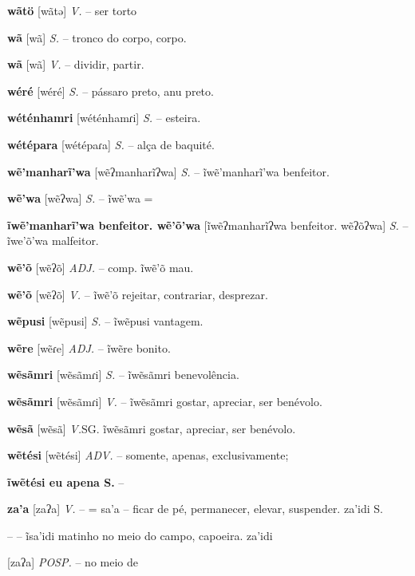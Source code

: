 {{{{{{{{{{{{{\textbf{wãtö} [wãtə] \textit{V.} -- {ser torto}

\textbf{wã} [wã] \textit{S.} -- tronco do corpo, corpo.

\textbf{wã} [wã] \textit{V.} -- dividir, partir.

\textbf{wéré} [wéré] \textit{S.} -- pássaro preto, anu preto.

\textbf{wéténhamri} [wéténhamɾi] \textit{S.} -- esteira.

\textbf{wétépara} [wétépaɾa] \textit{S.} -- alça de baquité.

\textbf{wẽ'manharĩ'wa} [wẽʔmanharĩʔwa] \textit{S.} -- ĩwẽ'manharĩ'wa benfeitor.

\textbf{wẽ'wa} [wẽʔwa] \textit{S.} -- ĩwẽ'wa =

\textbf{ĩwẽ'manharĩ'wa benfeitor. wẽ'õ'wa} [ĩwẽʔmanharĩʔwa benfeitor. wẽʔõʔwa] \textit{S.} -- ĩwe'õ'wa malfeitor.

\textbf{wẽ'õ} [wẽʔõ] \textit{ADJ.} -- comp. ĩwẽ'õ mau.

\textbf{wẽ'õ} [wẽʔõ] \textit{V.} -- ĩwẽ'õ rejeitar, contrariar, desprezar.

\textbf{wẽpusi} [wẽpusi] \textit{S.} -- ĩwẽpusi vantagem.

\textbf{wẽre} [wẽɾe] \textit{ADJ.} -- ĩwẽre bonito.

\textbf{wẽsãmri} [wẽsãmɾi] \textit{S.} -- ĩwẽsãmri benevolência.

\textbf{wẽsãmri} [wẽsãmɾi] \textit{V.} -- ĩwẽsãmri gostar, apreciar, ser benévolo.

\textbf{wẽsã} [wẽsã] \textit{V.}SG. ĩwẽsãmri gostar, apreciar, ser benévolo.

\textbf{wẽtési} [wẽtési] \textit{ADV.} -- somente, apenas, exclusivamente;

\textbf{ĩwẽtési eu apena S.} -- \n%

\textbf{za'a} [zaʔa] \textit{V.} -- = sa'a -- ficar de pé, permanecer, elevar, suspender. za'idi S.} -- -- ĩsa'idi matinho no meio do campo, capoeira. za'idi} [zaʔa] \textit{POSP.} -- no meio de

}}}}}}}}}}}
